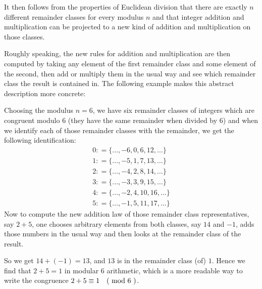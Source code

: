 It then follows from the properties of Euclidean division that there are exactly $ n $ different remainder classes for every modulus $n$ and that integer addition and multiplication can be projected to a new kind of addition and multiplication on those classes.

Roughly speaking, the new rules for addition and multiplication are then computed by taking any element of the first remainder class and some element of the second, then add or multiply them in the usual way and see which remainder class the result is contained in. The following example makes this abstract description more concrete:
\begin{example} 
\label{def_residue_ring_z_6}
Choosing the modulus $ n = 6 $, we have six remainder classes of integers which are congruent modulo $ 6 $ (they have the same remainder when divided by $6$) and when we identify each of those remainder classes with the remainder, we get the following identification:
$$
\begin{array}{l}
0: = \{\ldots, -6,0,6,12, \ldots \}\\
1: = \{\ldots, -5,1,7,13, \ldots \}\\
2: = \{\ldots, -4,2,8,14, \ldots \} \\
3: = \{\ldots, -3,3,9,15, \ldots \}\\
4: = \{\ldots, -2,4,10,16, \ldots \}\\
5: = \{\ldots, -1,5,11,17, \ldots \}
\end{array}
$$
Now to compute the new addition law of those remainder class representatives, say $2+5$, one chooses arbitrary elements from both classes, say $14$ and $-1$, adds those numbers in the usual way and then looks at the remainder class of the result.

So we get $14+(-1)=13$, and $13$ is in the remainder class (of) $1$. Hence we find that $2+5=1$ in modular $6$ arithmetic, which is a more readable way to write the congruence $2+5 \equiv 1 \quad \text{( mod } 6 \text{ )}$.


\end{example}
